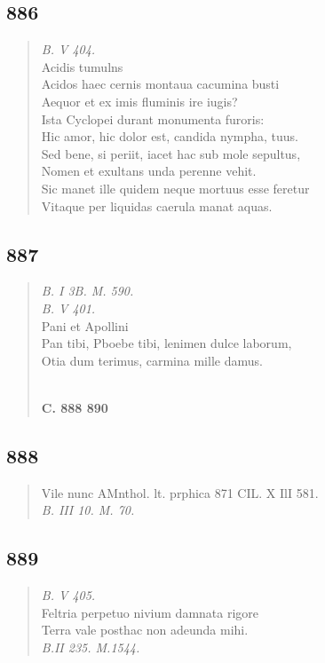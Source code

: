\documentclass[11pt, a4paper]{report}
\begin{document}
            \subsection*{886}
      \begin{verse}
      \textit{B. V 404.} \\ Acidis tumulns \\ Acidos haec cernis montaua cacumina busti \\ Aequor et ex imis fluminis ire iugis? \\ Ista Cyclopei durant monumenta furoris: \\ Hic amor, hic dolor est, candida nympha, tuus. \\ Sed bene, si periit, iacet hac sub mole sepultus, \\ Nomen et exultans unda perenne vehit. \\ Sic manet ille quidem neque mortuus esse feretur \\ Vitaque per liquidas caerula manat aquas. \\ 
      \end{verse}
  
            \subsection*{887}
      \begin{verse}
      \textit{B. I 3B. M. 590.} \\ \textit{B. V 401.} \\ Pani et Apollini \\ Pan tibi, Pboebe tibi, lenimen dulce laborum, \\ Otia dum terimus, carmina mille damus. \\ 
        ﻿\pagebreak 
     \marginpar{[333]} \begin{center} \textbf{C. 888 890} \end{center}
      \end{verse}
  
            \subsection*{888}
      \begin{verse}
      Vile nunc AMnthol. lt. prphica 871 CIL. X IlI 581. \\ \textit{B. III 10. M. 70.} \\ 
      \end{verse}
  
            \subsection*{889}
      \begin{verse}
      \textit{B. V 405.} \\ Feltria perpetuo nivium damnata rigore \\ Terra vale posthac non adeunda mihi. \\ \textit{B.II 235. M.1544.} \\ 
      \end{verse}
  
\end{document}

